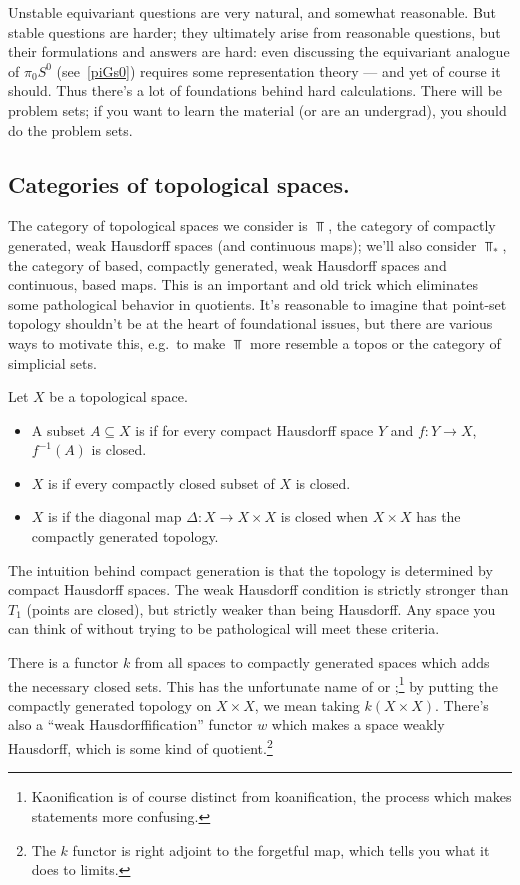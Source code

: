 Unstable equivariant questions are very natural, and somewhat reasonable. But stable questions are harder; they
ultimately arise from reasonable questions, but their formulations and answers are hard: even discussing the
equivariant analogue of $\pi_0S^0$ (see~\eqref{piGs0}) requires some representation theory --- and yet of course it
should. Thus there's a lot of foundations behind hard calculations. There will be problem sets; if you want to
learn the material (or are an undergrad), you should do the problem sets.
\subsection*{Categories of topological spaces.}
The category of topological spaces we consider is $\Top$, the category of compactly generated, weak Hausdorff
spaces (and continuous maps); we'll also consider $\Top_*$, the category of based, compactly generated, weak
Hausdorff spaces and continuous, based maps. This is an important and old trick which eliminates some pathological
behavior in quotients. It's reasonable to imagine that point-set topology shouldn't be at the heart of foundational
issues, but there are various ways to motivate this, e.g.\ to make $\Top$ more resemble a topos or the category of
simplicial sets.
\begin{defn}
Let $X$ be a topological space.
\begin{itemize}
	\item A subset $A\subseteq X$ is  if for every compact Hausdorff space $Y$ and $f\colon
	Y\to X$, $f^{-1}(A)$ is closed.
	\item $X$ is  if every compactly closed subset of $X$ is closed.
	\item $X$ is  if the diagonal map $\Delta\colon X\to X\times X$ is closed when $X\times X$
	has the compactly generated topology.
\end{itemize}
\end{defn}
The intuition behind compact generation is that the topology is determined by compact Hausdorff spaces. The weak
Hausdorff condition is strictly stronger than $T_1$ (points are closed), but strictly weaker than being Hausdorff.
Any space you can think of without trying to be pathological will meet these criteria.

There is a functor $k$ from all spaces to compactly generated spaces which adds the necessary closed sets. This has
the unfortunate name of  or ;\footnote{Kaonification is of course distinct
from koanification, the process which makes statements more confusing.} by putting the compactly generated topology
on $X\times X$, we mean taking $k(X\times X)$. There's also a ``weak Hausdorffification'' functor $w$ which makes a
space weakly Hausdorff, which is some kind of quotient.\footnote{The $k$ functor is right adjoint to the forgetful
map, which tells you what it does to limits.}

